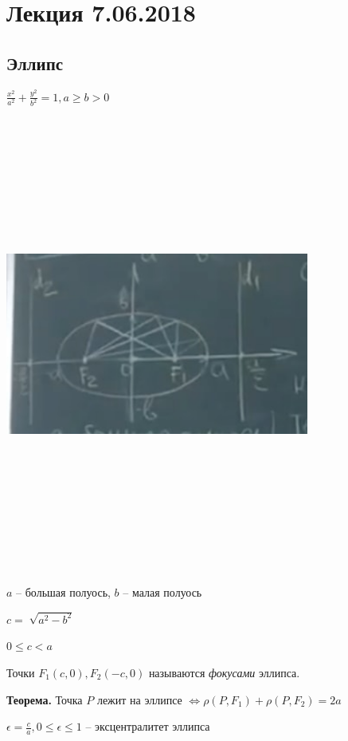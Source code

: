 \section{Лекция 7.06.2018}

\subsection{Эллипс}

$\frac{x^2}{a^2} + \frac{y^2}{b^2} = 1, a \geqslant b > 0$

\bigskip
\includegraphics[width=10cm,height=15cm,keepaspectratio]{example3.jpg}

\bigskip
$a$ -- большая полуось, $b$ -- малая полуось

$c = \sqrt[]{a^2 - b^2}$

$0 \leqslant c < a$

Точки $F_1(c, 0), F_2(-c, 0)$ называются \textit{фокусами} эллипса.

\bigskip
\textbf{Теорема.} Точка $P$ лежит на эллипсе $\Leftrightarrow \rho(P, F_1) + \rho(P, F_2) = 2a$

\bigskip
$\epsilon = \frac{c}{a}, 0 \leqslant \epsilon \leqslant 1$ -- эксцентралитет эллипса

